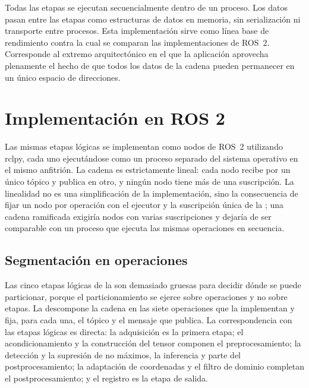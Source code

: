 Todas las etapas se ejecutan secuencialmente dentro de un proceso. Los datos
pasan entre las etapas como estructuras de datos en memoria, sin
serialización ni transporte entre procesos. Esta implementación sirve como
línea base de rendimiento contra la cual se comparan las implementaciones de
ROS~2. Corresponde al extremo arquitectónico en el que la aplicación
aprovecha plenamente el hecho de que todos los datos de la cadena pueden
permanecer en un único espacio de direcciones.

\section{Implementación en ROS 2}
\label{sec:ros2-implementation}

Las mismas etapas lógicas se implementan como nodos de ROS~2 utilizando
rclpy, cada uno ejecutándose como un proceso separado del sistema operativo
en el mismo anfitrión. La cadena es estrictamente lineal: cada nodo recibe
por un único tópico y publica en otro, y ningún nodo tiene más de una
suscripción. La linealidad no es una simplificación de la implementación,
sino la consecuencia de fijar un nodo por operación con el ejecutor y la
suscripción única de la ; una cadena ramificada exigiría
nodos con varias suscripciones y dejaría de ser comparable con un proceso
que ejecuta las mismas operaciones en secuencia.

\subsection{Segmentación en operaciones}
\label{sec:operations}

Las cinco etapas lógicas de la  son demasiado gruesas
para decidir dónde se puede particionar, porque el particionamiento se
ejerce sobre operaciones y no sobre etapas. La 
descompone la cadena en las siete operaciones que la implementan y fija,
para cada una, el tópico y el mensaje que publica. La correspondencia con
las etapas lógicas es directa: la adquisición es la primera etapa; el
acondicionamiento y la construcción del tensor componen el
preprocesamiento; la detección y la supresión de no máximos, la inferencia y
parte del postprocesamiento; la adaptación de coordenadas y el filtro de
dominio completan el postprocesamiento; y el registro es la etapa de salida.

